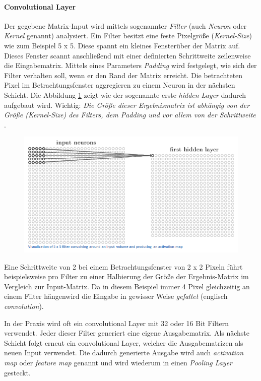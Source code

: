 \paragraph{Convolutional Layer}
Der gegebene Matrix-Input wird mittels sogenannter \emph{Filter} (auch \emph{Neuron} oder \emph{Kernel} genannt) analysiert. Ein Filter besitzt eine feste Pixelgröße (\emph{Kernel-Size}) wie zum Beispiel 5 x 5. Diese spannt ein kleines \glqq Fenster\grqq  über der Matrix auf. Dieses Fenster scannt anschließend mit einer definierten Schrittweite zeilenweise die Eingabematrix. Mittels eines Parameters \emph{Padding} wird festgelegt, wie sich der Filter verhalten soll, wenn er den Rand der Matrix erreicht. Die betrachteten Pixel im Betrachtungsfenster aggregieren zu einem Neuron in der nächsten Schicht. Die Abbildung \ref{fig:cnn_convLayer} zeigt wie der sogenannte erste \emph{hidden Layer} dadurch aufgebaut wird. Wichtig: \emph{Die Größe dieser Ergebnismatrix ist abhängig von der Größe (Kernel-Size) des Filters, dem Padding und vor allem von der Schrittweite} \cite{cnnFunktionsweise2}. 

\begin{figure}[!htb]
	\centering
	\includegraphics[width=.6\linewidth]{img/cnn_convLayer}
	\label{fig:cnn_convLayer}
\end{figure}

Eine Schrittweite von 2 bei einem Betrachtungsfenster von 2 x 2 Pixeln führt beispielsweise pro Filter zu einer Halbierung der Größe der Ergebnis-Matrix im Vergleich zur Input-Matrix. Da in diesem Beispiel immer 4 Pixel gleichzeitig an einem Filter \glqq hängen\grqq  wird die Eingabe in gewisser Weise \emph{gefaltet} (englisch \emph{convolution}). 

In der Praxis wird oft ein convolutional Layer mit 32 oder 16 Bit Filtern verwendet. Jeder dieser Filter generiert eine eigene Ausgabematrix. Als nächste Schicht folgt erneut ein convolutional Layer, welcher die Ausgabematrizen als neuen Input verwendet. Die dadurch generierte Ausgabe wird auch \emph{activation map} oder \emph{feature map} genannt und wird wiederum in einen \emph{Pooling Layer} gesteckt. 

